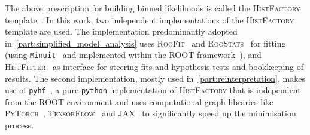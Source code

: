 The above prescription for building binned likelihoods is called the \textsc{HistFactory} template~\cite{Cranmer:1456844}. In this work, two independent implementations of the \textsc{HistFactory} template are used. The implementation predominantly adopted in~\cref{part:simplified_model_analysis} uses \textsc{RooFit}~\cite{RooFit:2003ir} and \textsc{RooStats}~\cite{RooStats:2010pm} for fitting (using \texttt{Minuit}~\cite{James:310399} and implemented within the \textsc{ROOT} framework~\cite{ROOT:1997pa,ROOT-2}), and \textsc{HistFitter}~\cite{HistFitter:2014wma} as interface for steering fits and hypothesis tests and bookkeeping of results. The second implementation, mostly used in~\cref{part:reinterpretation}, makes use of \texttt{pyhf}~\cite{pyhf_joss,pyhf}, a pure-\texttt{python} implementation of \textsc{HistFactory} that is independent from the \textsc{ROOT} environment and uses computational graph libraries like \textsc{PyTorch}~\cite{pytorch}, \textsc{TensorFlow}~\cite{tensorflow2015-whitepaper} and \textsc{JAX}~\cite{jax2018github} to significantly speed up the minimisation process.
 


